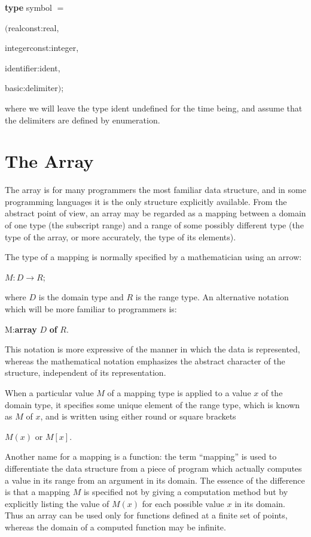 \quad \textbf{type} symbol $=$

\tabto*{5.6em}$($realconst:real,

\tabto*{6em}integerconst:integer,

\tabto*{6em}identifier:ident,

\tabto*{6em}basic:delimiter$)$;

\noindent
where we will leave the type ident undefined for the time being, and assume that the delimiters are defined by enumeration.

\section[The array]{The Array}
\label{sec:array}

The array is for many programmers the most familiar data structure, and in some programming languages it is the only structure explicitly available. From the abstract point of view, an array may be regarded as a mapping between a domain of one type (the subscript range) and a range of some possibly different type (the type of the array, or more accurately, the type of its elements).

The type of a mapping is normally specified by a mathematician using an arrow:

\quad $M:D\rightarrow R$;

\noindent
where $D$ is the domain type and $R$ is the range type. An alternative notation which will be more familiar to programmers is:

\quad M:\textbf{array} $D$ \textbf{of} $R$.

\noindent
This notation is more expressive of the manner in which the data is represented, whereas the mathematical notation emphasizes the abstract character of the structure, independent of its representation.

When a particular value $M$ of a mapping type is applied to a value $x$ of the domain type, it specifies some unique element of the range type, which is known as $M$ of $x$, and is written using either round or square brackets

\quad $M(x)$ or $M[x]$.

\noindent
Another name for a mapping is a function: the term ``mapping'' is used to differentiate the data structure from a piece of program which actually computes a value in its range from an argument in its domain. The essence of the difference is that a mapping $M$ is specified not by giving a computation method but by explicitly listing the value of $M(x)$ for each possible value $x$ in its domain. Thus an array can be used only for functions defined at a finite set of points, whereas the domain of a computed function may be infinite.

